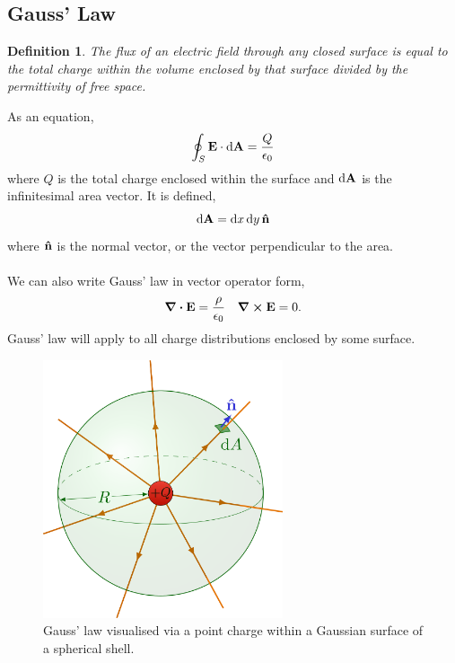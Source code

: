 \documentclass{book}
\newtheorem*{definition}{Definition}
\begin{document}
\subsection{Gauss' Law}
\begin{definition}
    The flux of an electric field through any closed surface is equal to the total charge within the volume enclosed by that surface divided by the permittivity of free space.
\end{definition}
As an equation,
\begin{equation}
    \oint_S \vb{E}\cdot\dd{\vb{A}} = \frac{Q}{\epsilon_0}
\end{equation}
where $Q$ is the total charge enclosed within the surface and $\dd{\vb{A}}$ is the infinitesimal area vector. It is defined,
\begin{equation}
    \dd{\vb{A}} = \dd{x}\dd{y}\vu{n}
\end{equation}
where $\vu{n}$ is the normal vector, or the vector perpendicular to the area.
\\\\
We can also write Gauss' law in vector operator form,
\begin{align}
    \div{\vb{E}} = \frac{\rho}{\epsilon_0} && \curl{\vb{E}}= 0.
\end{align}
Gauss' law will apply to all charge distributions enclosed by some surface.
\begin{figure}
    \centering
    \includegraphics[width=200pt]{electric_field_sphere-001.png}
    \caption{Gauss' law visualised via a point charge within a Gaussian surface of a spherical shell.}
    \label{fig:gauss}
\end{figure}
\end{document}

